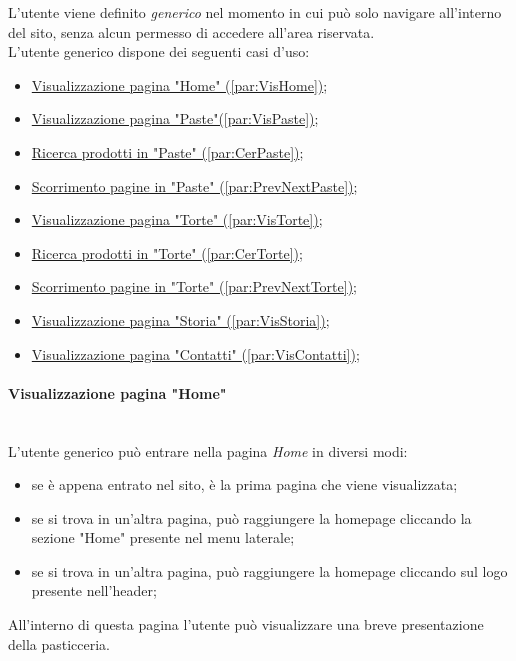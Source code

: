 L'utente viene definito \emph{generico} nel momento in cui può solo navigare all'interno del sito, senza alcun permesso di accedere all'area riservata.\\
L'utente generico dispone dei seguenti casi d'uso:
\begin{itemize}
	\item \hyperref[par:VisHome]{ Visualizzazione pagina "Home" (\ref{par:VisHome})};
	\item \hyperref[par:VisPaste]{ Visualizzazione pagina "Paste"(\ref{par:VisPaste})};
	\item \hyperref[par:CerPaste]{ Ricerca prodotti in "Paste" (\ref{par:CerPaste})};
	\item \hyperref[par:PrevNextPaste]{ Scorrimento pagine in "Paste" (\ref{par:PrevNextPaste})};
	\item \hyperref[par:VisTorte]{ Visualizzazione pagina "Torte" (\ref{par:VisTorte})};
	\item \hyperref[par:CerTorte]{ Ricerca prodotti in "Torte" (\ref{par:CerTorte})};
	\item \hyperref[par:PrevNextTorte]{ Scorrimento pagine in "Torte" (\ref{par:PrevNextTorte})};
	\item \hyperref[par:VisStoria]{ Visualizzazione pagina "Storia" (\ref{par:VisStoria})};
	\item \hyperref[par:VisContatti]{ Visualizzazione pagina "Contatti" (\ref{par:VisContatti})};
\end{itemize}

\paragraph{Visualizzazione pagina "Home"}\mbox{}\\
\label{par:VisHome}
L'utente generico può entrare nella pagina \emph{Home} in diversi modi:
\begin{itemize}
	\item se è appena entrato nel sito, è la prima pagina che viene visualizzata;
	\item se si trova in un'altra pagina, può raggiungere la homepage cliccando la sezione "Home" presente nel menu laterale;
	\item se si trova in un'altra pagina, può raggiungere la homepage cliccando sul logo presente nell'header;
\end{itemize}
All'interno di questa pagina l'utente può visualizzare una breve presentazione della pasticceria.\\


